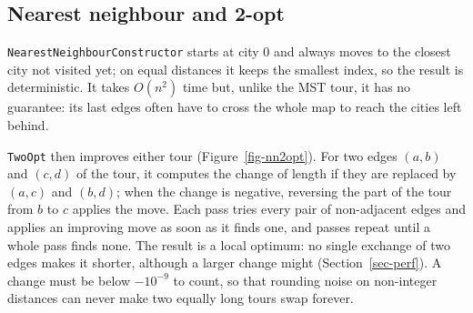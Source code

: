 \documentclass[10pt,a4paper]{article}
\begin{document}
\subsection{Nearest neighbour and 2-opt}\label{sec-nn2opt}

\texttt{NearestNeighbourConstructor} starts at city 0 and always moves to the closest city not visited yet; on equal distances it keeps the smallest index, so the result is deterministic. It takes $O(n^2)$ time but, unlike the MST tour, it has no guarantee: its last edges often have to cross the whole map to reach the cities left behind.

\texttt{TwoOpt} then improves either tour (Figure~\ref{fig-nn2opt}). For two edges $(a,b)$ and $(c,d)$ of the tour, it computes the change of length if they are replaced by $(a,c)$ and $(b,d)$; when the change is negative, reversing the part of the tour from $b$ to $c$ applies the move. Each pass tries every pair of non-adjacent edges and applies an improving move as soon as it finds one, and passes repeat until a whole pass finds none. The result is a local optimum: no single exchange of two edges makes it shorter, although a larger change might (Section~\ref{sec-perf}). A change must be below $-10^{-9}$ to count, so that rounding noise on non-integer distances can never make two equally long tours swap forever.
\end{document}
